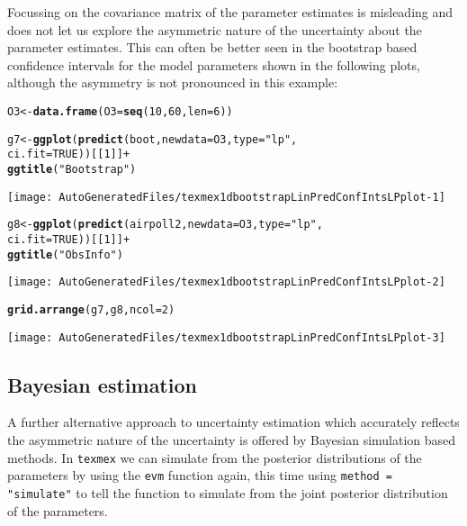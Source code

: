 \documentclass[10pt]{article}\usepackage[]{graphicx}\usepackage[]{color}
\makeatletter
\def\maxwidth{ %
  \ifdim\Gin@nat@width>\linewidth
    \linewidth
  \else
    \Gin@nat@width
  \fi
}
\newcommand{\hlnum}[1]{\textcolor[rgb]{0.686,0.059,0.569}{#1}}%
\newcommand{\hlstr}[1]{\textcolor[rgb]{0.192,0.494,0.8}{#1}}%
\newcommand{\hlopt}[1]{\textcolor[rgb]{0,0,0}{#1}}%
\newcommand{\hlstd}[1]{\textcolor[rgb]{0.345,0.345,0.345}{#1}}%
\newcommand{\hlkwb}[1]{\textcolor[rgb]{0.69,0.353,0.396}{#1}}%
\newcommand{\hlkwc}[1]{\textcolor[rgb]{0.333,0.667,0.333}{#1}}%
\newcommand{\hlkwd}[1]{\textcolor[rgb]{0.737,0.353,0.396}{\textbf{#1}}}%
\newenvironment{kframe}{%
 \def\at@end@of@kframe{}%
 \ifinner\ifhmode%
  \def\at@end@of@kframe{\end{minipage}}%
  \begin{minipage}{\columnwidth}%
 \fi\fi%
 \def\FrameCommand##1{\hskip\@totalleftmargin \hskip-\fboxsep
 \colorbox{shadecolor}{##1}\hskip-\fboxsep
     \hskip-\linewidth \hskip-\@totalleftmargin \hskip\columnwidth}%
 \MakeFramed {\advance\hsize-\width
   \@totalleftmargin\z@ \linewidth\hsize
   \@setminipage}}%
 {\par\unskip\endMakeFramed%
 \at@end@of@kframe}
\newenvironment{knitrout}{}{} %
\makeatother
\begin{document}
Focussing on the covariance matrix of the parameter estimates is misleading and does not let us explore the asymmetric nature of the uncertainty about the parameter estimates.  This can often be better seen in the bootstrap based confidence intervals for the model parameters shown in the following plots, although the asymmetry is not pronounced in this example:
\begin{knitrout}
\color{fgcolor}\begin{kframe}
\begin{alltt}
\hlstd{O3} \hlkwb{<-} \hlkwd{data.frame}\hlstd{(}\hlkwc{O3}\hlstd{=}\hlkwd{seq}\hlstd{(}\hlnum{10}\hlstd{,}\hlnum{60}\hlstd{,}\hlkwc{len}\hlstd{=}\hlnum{6}\hlstd{))}

\hlstd{g7} \hlkwb{<-} \hlkwd{ggplot}\hlstd{(}\hlkwd{predict}\hlstd{(boot,}    \hlkwc{newdata}\hlstd{=O3,}\hlkwc{type}\hlstd{=}\hlstr{"lp"}\hlstd{,}
                     \hlkwc{ci.fit}\hlstd{=}\hlnum{TRUE}\hlstd{))[[}\hlnum{1}\hlstd{]]} \hlopt{+}
    \hlkwd{ggtitle}\hlstd{(}\hlstr{"Bootstrap"}\hlstd{)}
\end{alltt}
\end{kframe}
\texttt{[image: AutoGeneratedFiles/texmex1dbootstrapLinPredConfIntsLPplot-1]} 
\begin{kframe}\begin{alltt}
\hlstd{g8} \hlkwb{<-} \hlkwd{ggplot}\hlstd{(}\hlkwd{predict}\hlstd{(airpoll2,}\hlkwc{newdata}\hlstd{=O3,}\hlkwc{type}\hlstd{=}\hlstr{"lp"}\hlstd{,}
                     \hlkwc{ci.fit}\hlstd{=}\hlnum{TRUE}\hlstd{))[[}\hlnum{1}\hlstd{]]} \hlopt{+}
    \hlkwd{ggtitle}\hlstd{(}\hlstr{"Obs Info"}\hlstd{)}
\end{alltt}
\end{kframe}
\texttt{[image: AutoGeneratedFiles/texmex1dbootstrapLinPredConfIntsLPplot-2]} 
\begin{kframe}\begin{alltt}
\hlkwd{grid.arrange}\hlstd{(g7,g8,}\hlkwc{ncol}\hlstd{=}\hlnum{2}\hlstd{)}
\end{alltt}
\end{kframe}
\texttt{[image: AutoGeneratedFiles/texmex1dbootstrapLinPredConfIntsLPplot-3]} 

\end{knitrout}

\subsection{Bayesian estimation}
\label{sebsection:BayesEstimation}
A further alternative approach to uncertainty estimation which accurately reflects the asymmetric nature of the uncertainty is offered by Bayesian simulation based methods.  In {\tt texmex} we can simulate from the posterior distributions of the parameters by using the {\tt evm} function again, this time using {\tt method = "simulate"} to tell the function to simulate from the joint posterior distribution of the parameters.
\end{document}
